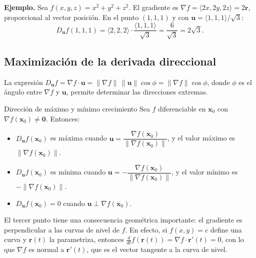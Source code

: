 \textbf{Ejemplo.} Sea $f(x, y, z) = x^2 + y^2 + z^2$. El gradiente es $\nabla f = \langle 2x, 2y, 2z \rangle = 2\mathbf{r}$, proporcional al vector posición. En el punto $(1, 1, 1)$ y con $\mathbf{u} = \langle 1, 1, 1 \rangle / \sqrt{3}$:
\[
D_{\mathbf{u}} f(1,1,1) = \langle 2, 2, 2 \rangle \cdot \frac{\langle 1,1,1\rangle}{\sqrt{3}} = \frac{6}{\sqrt{3}} = 2\sqrt{3}.
\]

\subsection{Maximización de la derivada direccional}

La expresión $D_{\mathbf{u}} f = \nabla f \cdot \mathbf{u} = \|\nabla f\|\,\|\mathbf{u}\|\cos\phi = \|\nabla f\|\cos\phi$, donde $\phi$ es el ángulo entre $\nabla f$ y $\mathbf{u}$, permite determinar las direcciones extremas.

\begin{mytheorem}{Dirección de máximo y mínimo crecimiento}
Sea $f$ diferenciable en $\mathbf{x}_0$ con $\nabla f(\mathbf{x}_0) \neq \mathbf{0}$. Entonces:
\begin{itemize}
    \item $D_{\mathbf{u}} f(\mathbf{x}_0)$ es máxima cuando $\mathbf{u} = \dfrac{\nabla f(\mathbf{x}_0)}{\|\nabla f(\mathbf{x}_0)\|}$, y el valor máximo es $\|\nabla f(\mathbf{x}_0)\|$.
    \item $D_{\mathbf{u}} f(\mathbf{x}_0)$ es mínima cuando $\mathbf{u} = -\dfrac{\nabla f(\mathbf{x}_0)}{\|\nabla f(\mathbf{x}_0)\|}$, y el valor mínimo es $-\|\nabla f(\mathbf{x}_0)\|$.
    \item $D_{\mathbf{u}} f(\mathbf{x}_0) = 0$ cuando $\mathbf{u} \perp \nabla f(\mathbf{x}_0)$.
\end{itemize}
\end{mytheorem}

El tercer punto tiene una consecuencia geométrica importante: el gradiente es perpendicular a las curvas de nivel de $f$. En efecto, si $f(x,y) = c$ define una curva y $\mathbf{r}(t)$ la parametriza, entonces $\frac{d}{dt}f(\mathbf{r}(t)) = \nabla f \cdot \mathbf{r}'(t) = 0$, con lo que $\nabla f$ es normal a $\mathbf{r}'(t)$, que es el vector tangente a la curva de nivel.

